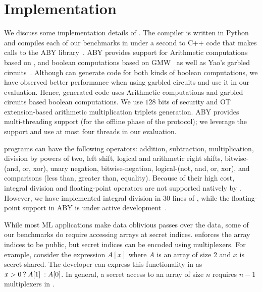 \vspace{-0.1in}
\section{Implementation}
\label{sec:impl}
We discuss some  implementation details of \tool.
The  \tool compiler is written in Python and
compiles each of our benchmarks in under a second to C++ code that
makes calls to the ABY
library~\cite{aby}. 
ABY provides support for Arithmetic computations based on \cite{autoS}, and boolean computations based on GMW~\cite{gmw} as well as Yao's garbled circuits~\cite{yao}. Although \tool can generate code for both kinds of boolean computations, we have observed better performance when using  garbled circuits
and use it in our evaluation. Hence, \tool generated code uses Arithmetic computations and garbled circuits based boolean computations.
We use $128$ bits of security and OT
extension-based arithmetic multiplication triplets generation. ABY
provides multi-threading support (for the offline phase of the \mpc
protocol); we leverage the support and use at most four threads in our
evaluation. 

\tool programs can have the following operators:
addition, subtraction, multiplication, division by powers of two, left
shift,
logical and arithmetic right shifts, bitwise-(and, or, xor), unary
negation, 
bitwise-negation, logical-(not, and, or, xor), and comparisons (less
than, greater than, equality).  
Because of their high cost, integral division and floating-point
operators are not supported natively by \tool. 
However, we have implemented integral division in 30 lines of \tool,
while the floating-point support in ABY is under active
development~\cite{ddkssz15}.

While most ML applications make data oblivious passes over the data,
some of our benchmarks do require accessing arrays at secret
indices. \tool enforces the array indices to be
public, but secret indices can be encoded using multiplexers.
For example, consider the expression $A[x]$ where $A$ is an array of
size 2 and $x$ is secret-shared. The developer can express
this functionality in \tool as ${{x > 0}\:?\:{A[1]}\::{A[0]}}$. In general,
a secret access to an array of size $n$ requires ${n}-1$ multiplexers
in \tool.


